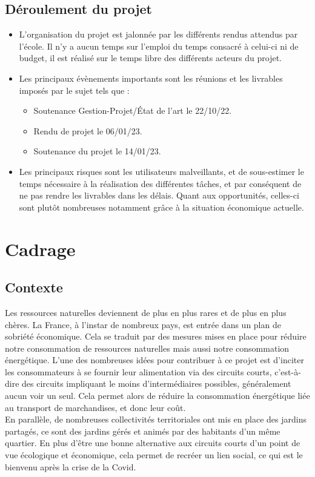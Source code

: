 \documentclass{report}
\begin{document}
\subsection*{Déroulement du projet}
\begin{itemize}
    \item L'organisation du projet est jalonnée par les différents rendus attendus par l'école. Il n'y a aucun temps sur l'emploi du temps consacré à celui-ci ni de budget, il est réalisé sur le temps libre des différents acteurs du projet.
    \item Les principaux évènements importants sont les réunions et les livrables imposés par le sujet tels que :
        \begin{itemize}
        \item Soutenance Gestion-Projet/État de l'art le 22/10/22.
        \item Rendu de projet le 06/01/23.
        \item Soutenance du projet le 14/01/23.
    \end{itemize}
    \item Les principaux risques sont les utilisateurs malveillants, et de sous-estimer le temps nécessaire à la réalisation des différentes tâches, et par conséquent de ne pas rendre les livrables dans les délais. Quant aux opportunités, celles-ci sont plutôt nombreuses notamment grâce à la situation économique actuelle.
\end{itemize}

\newpage




    \section{Cadrage}
   
    \subsection*{Contexte} 
    Les ressources naturelles deviennent de plus en plus rares et de plus en plus chères. La France, à l’instar de nombreux pays, est entrée dans un plan de sobriété économique. Cela se traduit par des mesures mises en place pour réduire notre consommation de ressources naturelles mais aussi notre consommation énergétique. 
    L’une des nombreuses idées pour contribuer à ce projet est d’inciter les consommateurs à se fournir leur alimentation via des circuits courts, c'est-à-dire des circuits impliquant le moins d’intermédiaires possibles, généralement aucun voir un seul. Cela permet alors de réduire la consommation énergétique liée au transport de marchandises, et donc leur coût. \\
    En parallèle, de nombreuses collectivités territoriales ont mis en place des jardins partagés, ce sont des jardins gérés et animés par des habitants d’un même quartier. En plus d’être une bonne alternative aux circuits courts d’un point de vue écologique et économique, cela permet de recréer un lien social, ce qui est le bienvenu après la crise de la Covid. \\
    
\end{document}
